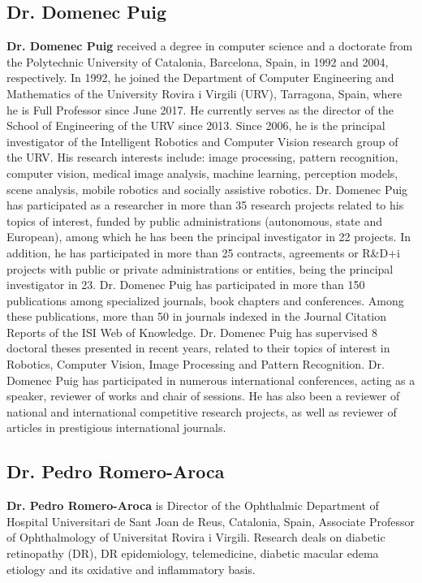 \documentclass{elsarticle}
\begin{document}
\subsection*{Dr. Domenec Puig}
\textbf{Dr. Domenec Puig} received a degree in computer science and a doctorate from the Polytechnic University of Catalonia, Barcelona, ​​Spain, in 1992 and 2004, respectively. In 1992, he joined the Department of Computer Engineering and Mathematics of the University Rovira i Virgili (URV), Tarragona, Spain, where he is Full Professor since June 2017. He currently serves as the director of the School of Engineering of the URV since 2013. Since 2006, he is the principal investigator of the Intelligent Robotics and Computer Vision research group of the URV. His research interests include: image processing, pattern recognition, computer vision, medical image analysis, machine learning, perception models, scene analysis, mobile robotics and socially assistive robotics. Dr. Domenec Puig has participated as a researcher in more than 35 research projects related to his topics of interest, funded by public administrations (autonomous, state and European), among which he has been the principal investigator in 22 projects. In addition, he has participated in more than 25 contracts, agreements or R\&D+i projects with public or private administrations or entities, being the principal investigator in 23. Dr. Domenec Puig has participated in more than 150 publications among specialized journals, book chapters and conferences. Among these publications, more than 50 in journals indexed in the Journal Citation Reports of the ISI Web of Knowledge. Dr. Domenec Puig has supervised 8 doctoral theses presented in recent years, related to their topics of interest in Robotics, Computer Vision, Image Processing and Pattern Recognition. Dr. Domenec Puig has participated in numerous international conferences, acting as a speaker, reviewer of works and chair of sessions. He has also been a reviewer of national and international competitive research projects, as well as reviewer of articles in prestigious international journals.

\subsection*{Dr. Pedro Romero-Aroca}
\textbf{Dr. Pedro Romero-Aroca} is Director of the Ophthalmic Department of Hospital Universitari de Sant Joan de Reus, Catalonia, Spain, Associate Professor of Ophthalmology of Universitat Rovira i Virgili. Research deals on diabetic retinopathy (DR), DR epidemiology, telemedicine, diabetic macular edema etiology and its oxidative and inflammatory basis.
\end{document}
